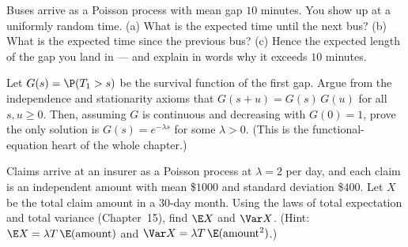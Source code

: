 \begin{exercise}
\label{ch25:exr-inspection}
Buses arrive as a Poisson process with mean gap $10$ minutes. You show up at a
uniformly random time. (a) What is the expected time until the next bus? (b) What
is the expected time since the previous bus? (c) Hence the expected length of the
gap you land in --- and explain in words why it exceeds $10$ minutes.
\end{exercise}

\begin{exercise}
\label{ch25:exr-proof}
Let $G(s) = \P(T_1 > s)$ be the survival function of the first gap. Argue from
the independence and stationarity axioms that
$G(s+u) = G(s)\,G(u)$ for all $s,u\ge 0$. Then, assuming $G$ is continuous and
decreasing with $G(0)=1$, prove the only solution is $G(s) = e^{-\lambda s}$ for
some $\lambda > 0$. (This is the functional-equation heart of the whole chapter.)
\end{exercise}

\begin{exercise}
\label{ch25:exr-compound}
Claims arrive at an insurer as a Poisson process at $\lambda = 2$ per day, and
each claim is an independent amount with mean \$$1000$ and standard deviation
\$$400$. Let $X$ be the total claim amount in a $30$-day month. Using the laws of
total expectation and total variance (Chapter~15), find $\E X$ and $\Var X$.
(Hint: $\E X = \lambda T\,\E(\text{amount})$ and
$\Var X = \lambda T\,\E(\text{amount}^2)$.)
\end{exercise}
